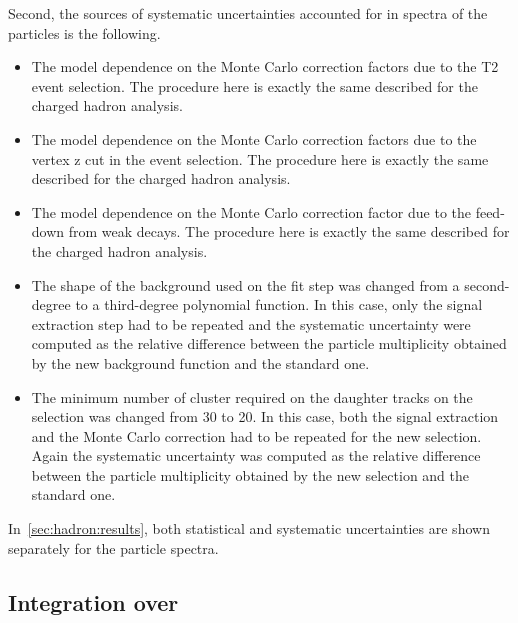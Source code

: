 Second, the sources of systematic uncertainties accounted for in
spectra of the \vzero particles is the following.
\begin{itemize}
  
\item The model dependence on the Monte Carlo correction factors due to
  the T2 event selection. The procedure here is exactly the same described
  for the charged hadron analysis.
  
\item The model dependence on the Monte Carlo correction factors due to
  the vertex z cut in the event selection.
  The procedure here is exactly the same described
  for the charged hadron analysis.
  
\item The model dependence on the Monte Carlo correction factor due to
  the feed-down from weak decays. The procedure here is exactly the same described
  for the charged hadron analysis.
  
\item The shape of the background used on the \minv fit step
  was changed from a second-degree to a third-degree polynomial
  function. In this case, only the signal extraction step had to be
  repeated and the systematic uncertainty were computed as the relative
  difference between the particle multiplicity obtained by the new
  background function and the standard one.

\item The minimum number of cluster required on the daughter tracks on the
  \vzero selection was changed from 30 to 20. In this case, both the signal
  extraction and the Monte Carlo correction had to be repeated for the new \vzero
  selection. Again the systematic uncertainty was computed as the relative
  difference between the particle multiplicity obtained by the new
  selection and the standard one.

\end{itemize}

In~\cref{sec:hadron:results}, both statistical and systematic uncertainties
are shown separately for the particle spectra.

\subsection[Integration over \pT]{\boldmath Integration over \pT}
\label{sec:hadron:spec:int}


